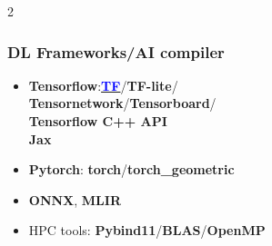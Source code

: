 \documentclass[11pt]{article}
\begin{document}
\begin{multicols*}{2}
\subsubsection*{DL Frameworks/AI compiler}
\begin{itemize}[noitemsep]
    \item \textbf{Tensorflow}:\href{https://github.com/Kuo-TingKai/TNNN}{\textbf{\textcolor{blue}{TF}}}/\textbf{TF-lite}/\\\textbf{Tensornetwork}/\textbf{Tensorboard}/\\\textbf{Tensorflow C++ API}\\
    \textbf{Jax}
    \item \textbf{Pytorch}: \textbf{torch}/\textbf{torch\_geometric}
    \item \textbf{ONNX}, \textbf{MLIR}
    \item HPC tools: \textbf{Pybind11}/\textbf{BLAS}/\textbf{OpenMP} 
\end{itemize}

\end{multicols*}
\end{document}
